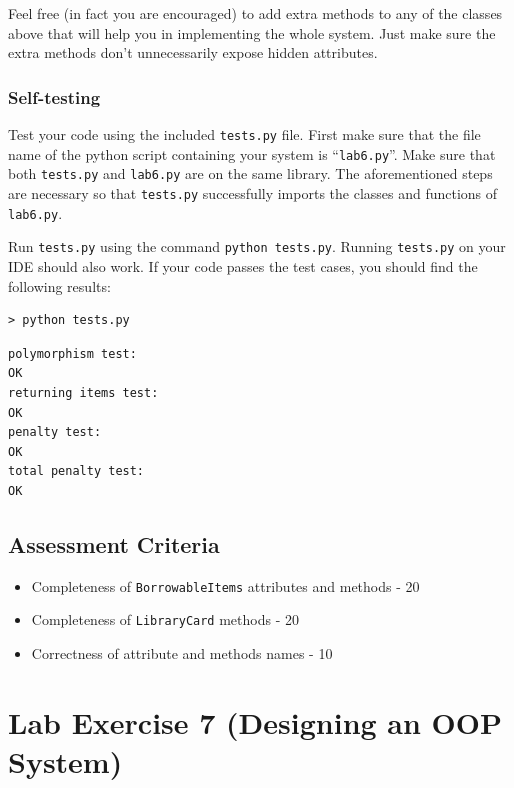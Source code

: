 Feel free (in fact you are encouraged) to add extra methods to any of
the classes above that will help you in implementing the whole system.
Just make sure the extra methods don't unnecessarily expose hidden
attributes.

\subsection{Self-testing}\label{lab-exercise-6-borrowing-from-the-library.md__self-testing}

Test your code using the included \texttt{tests.py} file. First make
sure that the file name of the python script containing your system is
``\texttt{lab6.py}''. Make sure that both \texttt{tests.py} and
\texttt{lab6.py} are on the same library. The aforementioned steps are
necessary so that \texttt{tests.py} successfully imports the classes and
functions of \texttt{lab6.py}.

Run \texttt{tests.py} using the command \texttt{python\ tests.py}.
Running \texttt{tests.py} on your IDE should also work. If your code
passes the test cases, you should find the following results:

\begin{verbatim}
> python tests.py
\end{verbatim}

\begin{verbatim}
polymorphism test:
OK
returning items test:
OK
penalty test:
OK
total penalty test:
OK
\end{verbatim}

\section{Assessment
Criteria}\label{lab-exercise-6-borrowing-from-the-library.md__assessment-criteria}

\begin{itemize}
\tightlist
\item
  Completeness of \texttt{BorrowableItems} attributes and methods - 20
\item
  Completeness of \texttt{LibraryCard} methods - 20
\item
  Correctness of attribute and methods names - 10
\end{itemize}

\chapter{Lab Exercise 7 (Designing an OOP
System)}\label{lab-exercise-7-designing-an-oop-system.md__lab-exercise-7-designing-an-oop-system}

